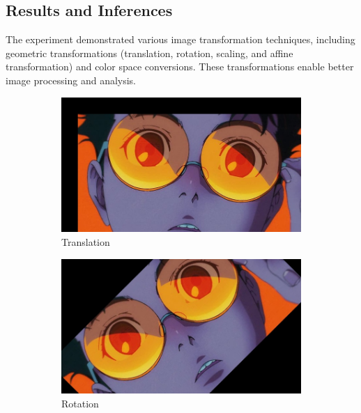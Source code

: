 \documentclass[12pt,a4paper]{article}
\begin{document}
\subsection{Results and Inferences}
The experiment demonstrated various image transformation techniques, including geometric transformations (translation, rotation, scaling, and affine transformation) and color space conversions. These transformations enable better image processing and analysis.

\begin{figure}[H]
  \centering
  \begin{subfigure}[b]{0.45\textwidth}
    \includegraphics[width=\textwidth]{transformations/translated.jpg}
    \caption{Translation}
  \end{subfigure}
  \hfill
  \begin{subfigure}[b]{0.45\textwidth}
    \includegraphics[width=\textwidth]{transformations/rotated.jpg}
    \caption{Rotation}
  \end{subfigure}
  \vspace{1em}
  \begin{subfigure}[b]{0.45\textwidth}

\end{subfigure}
\end{figure}
\end{document}
